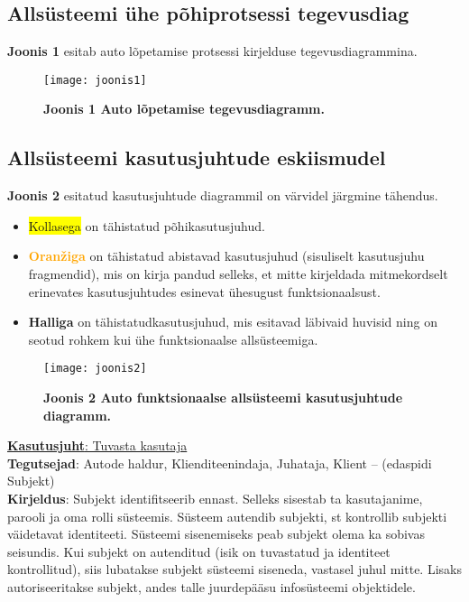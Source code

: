 \subsection{Allsüsteemi ühe põhiprotsessi tegevusdiag}

\textbf{Joonis 1} esitab auto lõpetamise protsessi kirjelduse tegevusdiagrammina. 
\begin{figure}[H]
	\texttt{[image: joonis1]}
	\caption{\textbf{Joonis 1 Auto lõpetamise tegevusdiagramm.}}
\end{figure}

\subsection{Allsüsteemi kasutusjuhtude eskiismudel}
\textbf{Joonis 2} esitatud kasutusjuhtude diagrammil on värvidel järgmine tähendus.

\begin{itemize}
	\item \colorbox{yellow}{Kollasega} on tähistatud põhikasutusjuhud.
	\item \textbf{\textcolor{orange}{Oranžiga}} on tähistatud abistavad kasutusjuhud (sisuliselt kasutusjuhu fragmendid), mis on kirja pandud selleks, et mitte kirjeldada mitmekordselt erinevates kasutusjuhtudes esinevat ühesugust funktsionaalsust.
	\item \textbf{\colorbox{light-gray}{Halliga}} on tähistatudkasutusjuhud, mis esitavad läbivaid huvisid ning on seotud rohkem kui ühe funktsionaalse allsüsteemiga.
\end{itemize}

\begin{figure}[H]
	\texttt{[image: joonis2]}
	\caption{\textbf{Joonis 2 Auto funktsionaalse allsüsteemi kasutusjuhtude diagramm.}}
\end{figure}

\begin{flushleft}
\underline{\textbf{Kasutusjuht}: Tuvasta kasutaja} \\
\textbf{Tegutsejad}: Autode haldur, Klienditeenindaja, Juhataja, Klient – (edaspidi Subjekt) \\
\textbf{Kirjeldus}: Subjekt identifitseerib ennast. Selleks sisestab ta kasutajanime, parooli ja oma rolli süsteemis. Süsteem autendib subjekti, st kontrollib subjekti väidetavat identiteeti. Süsteemi sisenemiseks peab subjekt olema ka sobivas seisundis. Kui subjekt on autenditud (isik on tuvastatud ja identiteet kontrollitud), siis lubatakse subjekt süsteemi siseneda, vastasel juhul mitte. Lisaks autoriseeritakse subjekt, andes talle juurdepääsu infosüsteemi objektidele.
\end{flushleft}

